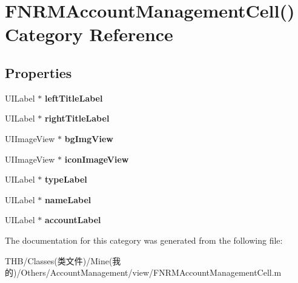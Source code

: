 \hypertarget{category_f_n_r_m_account_management_cell_07_08}{}\section{F\+N\+R\+M\+Account\+Management\+Cell() Category Reference}
\label{category_f_n_r_m_account_management_cell_07_08}
\subsection*{Properties}
\begin{DoxyCompactItemize}
\item 
\mbox{\label{category_f_n_r_m_account_management_cell_07_08_a447799115db69a19f011f7a4641d6926}} 
U\+I\+Label $\ast$ {\bfseries left\+Title\+Label}
\item 
\mbox{\label{category_f_n_r_m_account_management_cell_07_08_a7d6558e5d5a7720ae90effe71e82012c}} 
U\+I\+Label $\ast$ {\bfseries right\+Title\+Label}
\item 
\mbox{\label{category_f_n_r_m_account_management_cell_07_08_adf8d41a47127fa48ebe6cad0460d6238}} 
U\+I\+Image\+View $\ast$ {\bfseries bg\+Img\+View}
\item 
\mbox{\label{category_f_n_r_m_account_management_cell_07_08_a9f0022fa16aa216275e65f3cd4ea3f4a}} 
U\+I\+Image\+View $\ast$ {\bfseries icon\+Image\+View}
\item 
\mbox{\label{category_f_n_r_m_account_management_cell_07_08_a25d7e2e74383492bc9986f5cf008f2e1}} 
U\+I\+Label $\ast$ {\bfseries type\+Label}
\item 
\mbox{\label{category_f_n_r_m_account_management_cell_07_08_a1c07d8867996816e5f4191765e4ec5b6}} 
U\+I\+Label $\ast$ {\bfseries name\+Label}
\item 
\mbox{\label{category_f_n_r_m_account_management_cell_07_08_a6961c54683e6fcc984d56b86c1ee3d38}} 
U\+I\+Label $\ast$ {\bfseries account\+Label}
\end{DoxyCompactItemize}


The documentation for this category was generated from the following file\+:\begin{DoxyCompactItemize}
\item 
T\+H\+B/\+Classes(类文件)/\+Mine(我的)/\+Others/\+Account\+Management/view/F\+N\+R\+M\+Account\+Management\+Cell.\+m\end{DoxyCompactItemize}
